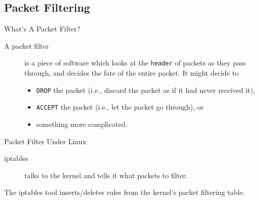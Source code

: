 

\subsection{Packet Filtering}

\begin{frame}{What's A Packet Filter?}
  \begin{description}
  \item[A packet filter] is a piece of software which looks at the
    \texttt{header} of packets as they pass through, and decides the
    fate of the entire packet. It might decide to
    \begin{itemize}
    \item \texttt{DROP} the packet (i.e., discard the packet as if it
      had never received it),
    \item \texttt{ACCEPT} the packet (i.e., let the packet go
      through), or
    \item something more complicated.
    \end{itemize}
  \end{description}
\end{frame}

\begin{frame}{Packet Filter Under Linux}
  \begin{description}
  \item[iptables] talks to the kernel and tells it what packets to filter.
  \end{description}
  The iptables tool inserts/deletes rules from the kernel's packet filtering table.
\end{frame}

